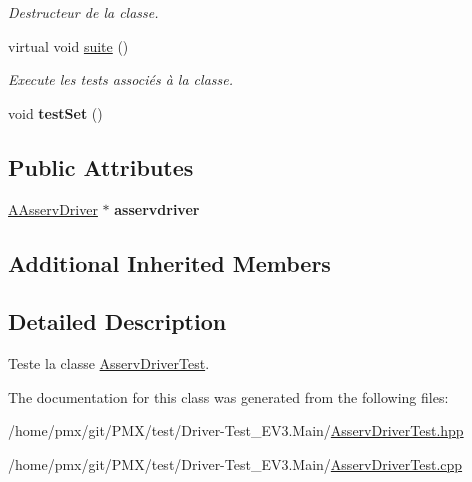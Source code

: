 \begin{DoxyCompactItemize}
\begin{DoxyCompactList}\small\item\em Destructeur de la classe. \end{DoxyCompactList}\item 
\mbox{\label{classtest_1_1AsservDriverTest_a8eff50a3e366b1af363c7cb37c57a622}} 
virtual void \hyperlink{classtest_1_1AsservDriverTest_a8eff50a3e366b1af363c7cb37c57a622}{suite} ()
\begin{DoxyCompactList}\small\item\em Execute les tests associés à la classe. \end{DoxyCompactList}\item 
\mbox{\label{classtest_1_1AsservDriverTest_a9d878d1ccd0f5f8e93275e80d4917c4f}} 
void {\bfseries test\+Set} ()
\end{DoxyCompactItemize}
\subsection*{Public Attributes}
\begin{DoxyCompactItemize}
\item 
\mbox{\label{classtest_1_1AsservDriverTest_a2bd21fbfc5cdfe25fb2c8981bc319046}} 
\hyperlink{classAAsservDriver}{A\+Asserv\+Driver} $\ast$ {\bfseries asservdriver}
\end{DoxyCompactItemize}
\subsection*{Additional Inherited Members}


\subsection{Detailed Description}
Teste la classe \hyperlink{classtest_1_1AsservDriverTest}{Asserv\+Driver\+Test}. 

The documentation for this class was generated from the following files\+:\begin{DoxyCompactItemize}
\item 
/home/pmx/git/\+P\+M\+X/test/\+Driver-\/\+Test\+\_\+\+E\+V3.\+Main/\hyperlink{Driver-Test__EV3_8Main_2AsservDriverTest_8hpp}{Asserv\+Driver\+Test.\+hpp}\item 
/home/pmx/git/\+P\+M\+X/test/\+Driver-\/\+Test\+\_\+\+E\+V3.\+Main/\hyperlink{Driver-Test__EV3_8Main_2AsservDriverTest_8cpp}{Asserv\+Driver\+Test.\+cpp}\end{DoxyCompactItemize}
